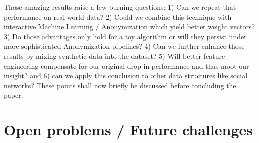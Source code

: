 \documentclass{llncs}
\begin{document}
Those amazing results raise a few burning questions: 1) Can we repeat that performance on real-world data? 2) Could we combine this technique with interactive Machine Learning / Anonymization which yield better weight vectors? 3) Do those advantages only hold for a toy algorithm or will they persist under more sophisticated Anonymization pipelines? 4) Can we further enhance those results by mixing synthetic data into the dataset? 5) Will better feature engineering compensate for our original drop in performance and thus moot our insight? and 6) can we apply this conclusion to other data structures like social networks? These points shall now briefly be discussed before concluding the paper.


\section{Open problems / Future challenges}
\label{sect:op_fc}
\end{document}
